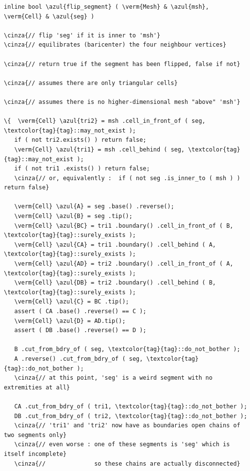 \begin{Verbatim}[commandchars=\\\{\},formatcom=\small\tt,frame=single,
   label=parag-\ref{\numb section 10.\numb parag 3}.cpp,rulecolor=\color{moldura},
   baselinestretch=0.94,framesep=2mm]
inline bool \azul{flip_segment} ( \verm{Mesh} & \azul{msh}, \verm{Cell} & \azul{seg} )

\cinza{// flip 'seg' if it is inner to 'msh'}
\cinza{// equilibrates (baricenter) the four neighbour vertices}

\cinza{// return true if the segment has been flipped, false if not}

\cinza{// assumes there are only triangular cells}
	
\cinza{// assumes there is no higher-dimensional mesh "above" 'msh'}

\{  \verm{Cell} \azul{tri2} = msh .cell_in_front_of ( seg, \textcolor{tag}{tag}::may_not_exist );
   if ( not tri2.exists() ) return false; 
   \verm{Cell} \azul{tri1} = msh .cell_behind ( seg, \textcolor{tag}{tag}::may_not_exist );
   if ( not tri1 .exists() ) return false;
   \cinza{// or, equivalently :  if ( not seg .is_inner_to ( msh ) ) return false}

   \verm{Cell} \azul{A} = seg .base() .reverse();
   \verm{Cell} \azul{B} = seg .tip();
   \verm{Cell} \azul{BC} = tri1 .boundary() .cell_in_front_of ( B, \textcolor{tag}{tag}::surely_exists );
   \verm{Cell} \azul{CA} = tri1 .boundary() .cell_behind ( A, \textcolor{tag}{tag}::surely_exists );
   \verm{Cell} \azul{AD} = tri2 .boundary() .cell_in_front_of ( A, \textcolor{tag}{tag}::surely_exists );
   \verm{Cell} \azul{DB} = tri2 .boundary() .cell_behind ( B, \textcolor{tag}{tag}::surely_exists );
   \verm{Cell} \azul{C} = BC .tip();
   assert ( CA .base() .reverse() == C );
   \verm{Cell} \azul{D} = AD.tip();
   assert ( DB .base() .reverse() == D );
	
   B .cut_from_bdry_of ( seg, \textcolor{tag}{tag}::do_not_bother );
   A .reverse() .cut_from_bdry_of ( seg, \textcolor{tag}{tag}::do_not_bother );
   \cinza{// at this point, 'seg' is a weird segment with no extremities at all}
     
   CA .cut_from_bdry_of ( tri1, \textcolor{tag}{tag}::do_not_bother );
   DB .cut_from_bdry_of ( tri2, \textcolor{tag}{tag}::do_not_bother );
   \cinza{// 'tri1' and 'tri2' now have as boundaries open chains of two segments only}
   \cinza{// even worse : one of these segments is 'seg' which is itself incomplete}
   \cinza{//              so these chains are actually disconnected}
   

\end{Verbatim}
